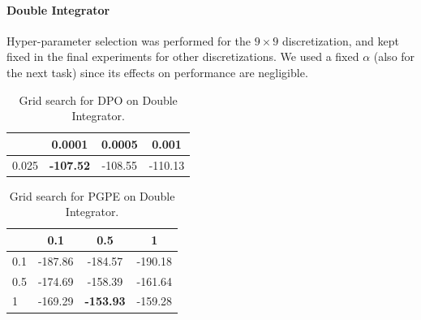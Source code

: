 \paragraph{Double Integrator} 
Hyper-parameter selection was performed for the $9\times 9$ discretization, and kept fixed in the final experiments for other discretizations. We used a fixed $\alpha$ (also for the next task) since its effects on performance are negligible. 
\begin{table}[H]
	\centering
	\begin{tabular}{l|*{3}{c}}
		\toprule
		\backslashbox{$\alpha$}{$\lambda$}
		&0.0001&0.0005&0.001\\
		\midrule
		0.025 & \textbf{-107.52} & -108.55 & -110.13 \\
		\bottomrule
	\end{tabular} \caption{\label{tab:t3}Grid search for \ac{DPO} on Double Integrator.}
\end{table}
\begin{table}[H]
	\centering
	\begin{tabular}{l|*{3}{c}}
		\toprule
		\backslashbox{$\alpha$}{$\sigma$}
		&0.1&0.5&1\\
		\midrule
		0.1 & -187.86 & -184.57 & -190.18 \\
		0.5 & -174.69 & -158.39 & -161.64 \\
		1 & -169.29 & \textbf{-153.93}	 & -159.28 \\
		\bottomrule
	\end{tabular} \caption{\label{tab:t6}Grid search for \ac{PGPE} on Double Integrator.}
\end{table}


